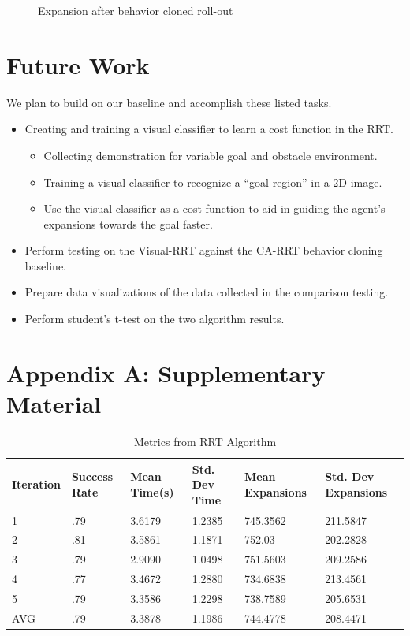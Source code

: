 \documentclass{article}
\begin{document}
\begin{figure}[h]
        \caption{Expansion after behavior cloned roll-out}
\end{figure}

\vspace{1cm}
\section{Future Work}
We plan to build on our baseline and accomplish these listed tasks. 
\begin{itemize}
  \item Creating and training a visual classifier to learn a cost function in the RRT.
  \begin{itemize}
    \item Collecting demonstration for variable goal and obstacle environment.
    \item Training a visual classifier to recognize a “goal region” in a 2D image.
    \item Use the visual classifier as a cost function to aid in guiding the agent’s expansions towards the goal faster.
  \end{itemize}
  \item Perform testing on the Visual-RRT against the CA-RRT behavior cloning baseline.
  \item Prepare data visualizations of the data collected in the comparison testing.
  \item Perform student’s t-test on the two algorithm results.
\end{itemize}





\vspace{1cm}
\section{Appendix A: Supplementary Material}

\begin{table}[h]
  \caption{Metrics from RRT Algorithm}
  \label{RRT Metrics}
  \centering
  \begin{tabular}{llllll}
    \cmidrule(r){1-6}
   Iteration & Success Rate & Mean Time(s) & Std. Dev Time & Mean Expansions & Std. Dev Expansions\\
    \midrule
    1 & .79 & 3.6179 & 1.2385 & 745.3562 & 211.5847 \\
    2 & .81 & 3.5861 & 1.1871 & 752.03 & 202.2828 \\
    3 & .79 & 2.9090 & 1.0498 & 751.5603 & 209.2586 \\
    4 & .77 & 3.4672 & 1.2880 & 734.6838 & 213.4561 \\
    5 & .79 & 3.3586 & 1.2298 & 738.7589 & 205.6531 \\
 \midrule
  AVG & .79 & 3.3878 & 1.1986 & 744.4778 & 208.4471 \\
    \bottomrule
  \end{tabular}
\end{table}
\end{document}
